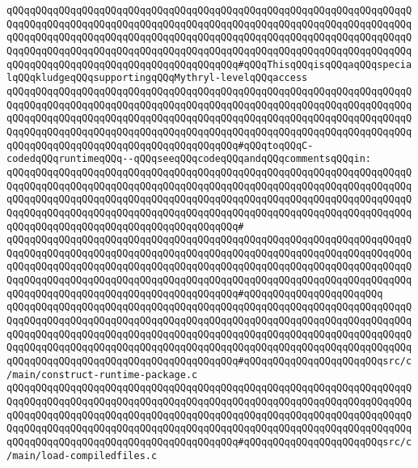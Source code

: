 \verb|qQQqqQQqqQQqqQQqqQQqqQQqqQQqqQQqqQQqqQQqqQQqqQQqqQQqqQQqqQQqqQQqqQQqqQQqqQQqqQQqqQQqqQQqqQQqqQQqqQQqqQQqqQQqqQQqqQQqqQQqqQQqqQQqqQQqqQQqqQQqqQQqqQQqqQQqqQQqqQQqqQQqqQQqqQQqqQQqqQQqqQQqqQQqqQQqqQQqqQQqqQQqqQQqqQQqqQQqqQQqqQQqqQQqqQQqqQQqqQQqqQQqqQQqqQQqqQQqqQQqqQQqqQQqqQQqqQQqqQQqqQQqqQQqqQQqqQQqqQQqqQQqqQQqqQQqqQQqqQQq#qQQqThisqQQqisqQQqaqQQqspecialqQQqkludgeqQQqsupportingqQQqMythryl-levelqQQqaccess|\newline
\verb|qQQqqQQqqQQqqQQqqQQqqQQqqQQqqQQqqQQqqQQqqQQqqQQqqQQqqQQqqQQqqQQqqQQqqQQqqQQqqQQqqQQqqQQqqQQqqQQqqQQqqQQqqQQqqQQqqQQqqQQqqQQqqQQqqQQqqQQqqQQqqQQqqQQqqQQqqQQqqQQqqQQqqQQqqQQqqQQqqQQqqQQqqQQqqQQqqQQqqQQqqQQqqQQqqQQqqQQqqQQqqQQqqQQqqQQqqQQqqQQqqQQqqQQqqQQqqQQqqQQqqQQqqQQqqQQqqQQqqQQqqQQqqQQqqQQqqQQqqQQqqQQqqQQqqQQqqQQqqQQq#qQQqtoqQQqC-codedqQQqruntimeqQQq--qQQqseeqQQqcodeqQQqandqQQqcommentsqQQqin:|\newline
\verb|qQQqqQQqqQQqqQQqqQQqqQQqqQQqqQQqqQQqqQQqqQQqqQQqqQQqqQQqqQQqqQQqqQQqqQQqqQQqqQQqqQQqqQQqqQQqqQQqqQQqqQQqqQQqqQQqqQQqqQQqqQQqqQQqqQQqqQQqqQQqqQQqqQQqqQQqqQQqqQQqqQQqqQQqqQQqqQQqqQQqqQQqqQQqqQQqqQQqqQQqqQQqqQQqqQQqqQQqqQQqqQQqqQQqqQQqqQQqqQQqqQQqqQQqqQQqqQQqqQQqqQQqqQQqqQQqqQQqqQQqqQQqqQQqqQQqqQQqqQQqqQQqqQQqqQQqqQQqqQQq#|\newline
\verb|qQQqqQQqqQQqqQQqqQQqqQQqqQQqqQQqqQQqqQQqqQQqqQQqqQQqqQQqqQQqqQQqqQQqqQQqqQQqqQQqqQQqqQQqqQQqqQQqqQQqqQQqqQQqqQQqqQQqqQQqqQQqqQQqqQQqqQQqqQQqqQQqqQQqqQQqqQQqqQQqqQQqqQQqqQQqqQQqqQQqqQQqqQQqqQQqqQQqqQQqqQQqqQQqqQQqqQQqqQQqqQQqqQQqqQQqqQQqqQQqqQQqqQQqqQQqqQQqqQQqqQQqqQQqqQQqqQQqqQQqqQQqqQQqqQQqqQQqqQQqqQQqqQQqqQQqqQQqqQQq#qQQqqQQqqQQqqQQqqQQqqQQq|\newline
\verb|qQQqqQQqqQQqqQQqqQQqqQQqqQQqqQQqqQQqqQQqqQQqqQQqqQQqqQQqqQQqqQQqqQQqqQQqqQQqqQQqqQQqqQQqqQQqqQQqqQQqqQQqqQQqqQQqqQQqqQQqqQQqqQQqqQQqqQQqqQQqqQQqqQQqqQQqqQQqqQQqqQQqqQQqqQQqqQQqqQQqqQQqqQQqqQQqqQQqqQQqqQQqqQQqqQQqqQQqqQQqqQQqqQQqqQQqqQQqqQQqqQQqqQQqqQQqqQQqqQQqqQQqqQQqqQQqqQQqqQQqqQQqqQQqqQQqqQQqqQQqqQQqqQQqqQQqqQQqqQQq#qQQqqQQqqQQqqQQqqQQqqQQqsrc/c/main/construct-runtime-package.c|\newline
\verb|qQQqqQQqqQQqqQQqqQQqqQQqqQQqqQQqqQQqqQQqqQQqqQQqqQQqqQQqqQQqqQQqqQQqqQQqqQQqqQQqqQQqqQQqqQQqqQQqqQQqqQQqqQQqqQQqqQQqqQQqqQQqqQQqqQQqqQQqqQQqqQQqqQQqqQQqqQQqqQQqqQQqqQQqqQQqqQQqqQQqqQQqqQQqqQQqqQQqqQQqqQQqqQQqqQQqqQQqqQQqqQQqqQQqqQQqqQQqqQQqqQQqqQQqqQQqqQQqqQQqqQQqqQQqqQQqqQQqqQQqqQQqqQQqqQQqqQQqqQQqqQQqqQQqqQQqqQQqqQQq#qQQqqQQqqQQqqQQqqQQqqQQqsrc/c/main/load-compiledfiles.c|\newline

